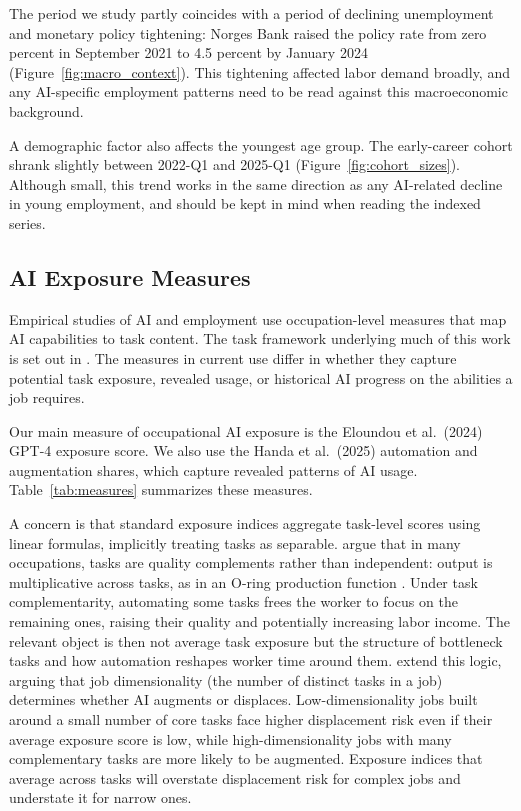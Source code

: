 \documentclass[12pt]{article}
\begin{document}
The period we study partly coincides with a period of declining unemployment and monetary policy tightening: Norges Bank raised the policy rate from zero percent in September 2021 to 4.5 percent by January 2024 (Figure~\ref{fig:macro_context}). This tightening affected labor demand broadly, and any AI-specific employment patterns need to be read against this macroeconomic background.

A demographic factor also affects the youngest age group. The early-career cohort shrank slightly between 2022-Q1 and 2025-Q1 (Figure~\ref{fig:cohort_sizes}). Although small, this trend works in the same direction as any AI-related decline in young employment, and should be kept in mind when reading the indexed series.


\subsection{AI Exposure Measures}\label{sec:data:ai}

Empirical studies of AI and employment use occupation-level measures that map AI capabilities to task content. The task framework underlying much of this work is set out in \citep{autor2003skill, acemoglu2011, acemoglu2018race, acemoglu2019automation}. The measures in current use differ in whether they capture potential task exposure, revealed usage, or historical AI progress on the abilities a job requires.

Our main measure of occupational AI exposure is the Eloundou et al.\ (2024) GPT-4 exposure score. We also use the Handa et al.\ (2025) automation and augmentation shares, which capture revealed patterns of AI usage. Table~\ref{tab:measures} summarizes these measures.

A concern is that standard exposure indices aggregate task-level scores using linear formulas, implicitly treating tasks as separable. \cite{gans2025} argue that in many occupations, tasks are quality complements rather than independent: output is multiplicative across tasks, as in an O-ring production function \citep{kremer1993}. Under task complementarity, automating some tasks frees the worker to focus on the remaining ones, raising their quality and potentially increasing labor income. The relevant object is then not average task exposure but the structure of bottleneck tasks and how automation reshapes worker time around them. \cite{imas2026} extend this logic, arguing that job dimensionality (the number of distinct tasks in a job) determines whether AI augments or displaces. Low-dimensionality jobs built around a small number of core tasks face higher displacement risk even if their average exposure score is low, while high-dimensionality jobs with many complementary tasks are more likely to be augmented. Exposure indices that average across tasks will overstate displacement risk for complex jobs and understate it for narrow ones.
\end{document}
